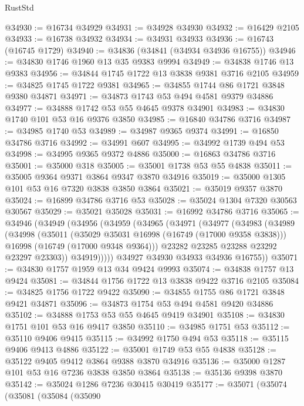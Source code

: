 \begin{lexlean}{RustStd}
\begin{coremodule}
@34930 := @16734 @34929
@34931 := @34928 @34930
@34932 := @16429 @2105
@34933 := @16738 @34932
@34934 := @34931 @34933
@34936 := @16743 (@16745 @1729)
@34940 := @34836 (@34841 (@34934 @34936 @16755))
@34946 := @34830 @1746 @1960 @13 @35 @9383 @9994
@34949 := @34838 @1746 @13 @9383
@34956 := @34844 @1745 @1722 @13 @3838 @9381 @3716 @2105
@34959 := @34825 @1745 @1722 @9381
@34965 := @34855 @1744 @86 @1721 @3848 @9380 @34871
@34971 := @34873 @1743 @53 @494 @4581 @9379 @34886
@34977 := @34888 @1742 @53 @55 @4645 @9378 @34901
@34983 := @34830 @1740 @101 @53 @16 @9376 @3850
@34985 := @16840 @34786 @3716
@34987 := @34985 @1740 @53
@34989 := @34987 @9365 @9374
@34991 := @16850 @34786 @3716
@34992 := @34991 @607
@34995 := @34992 @1739 @494 @53
@34998 := @34995 @9365 @9372 @4886
@35000 := @16863 @34786 @3716
@35001 := @35000 @318
@35005 := @35001 @1738 @53 @55 @4838
@35011 := @35005 @9364 @9371 @3864 @9347 @3870 @34916
@35019 := @35000 @1305 @101 @53 @16 @7320 @3838 @3850 @3864
@35021 := @35019 @9357 @3870
@35024 := @16899 @34786 @3716 @53
@35028 := @35024 @1304 @7320 @30563 @30567
@35029 := @35021 @35028
@35031 := @16992 @34786 @3716
@35065 := @34946
    (@34949
      (@34956
        (@34959
          (@34965
            (@34971
              (@34977
                (@34983
                  (@34989
                    (@34998
                      (@35011
                        (@35029 @35031 @16998 (@16749 (@17000 @9358 @3838)))
                        @16998
                        (@16749 (@17000 @9348 @9364)))
                      @23282
                      @23285
                      @23288
                      @23292
                      @23297
                      @23303))
                  @34919)))))
        @34927
        @34930
        @34933
        @34936
        @16755))
@35071 := @34830 @1757 @1959 @13 @34 @9424 @9993
@35074 := @34838 @1757 @13 @9424
@35081 := @34844 @1756 @1722 @13 @3838 @9422 @3716 @2105
@35084 := @34825 @1756 @1722 @9422
@35090 := @34855 @1755 @86 @1721 @3848 @9421 @34871
@35096 := @34873 @1754 @53 @494 @4581 @9420 @34886
@35102 := @34888 @1753 @53 @55 @4645 @9419 @34901
@35108 := @34830 @1751 @101 @53 @16 @9417 @3850
@35110 := @34985 @1751 @53
@35112 := @35110 @9406 @9415
@35115 := @34992 @1750 @494 @53
@35118 := @35115 @9406 @9413 @4886
@35122 := @35001 @1749 @53 @55 @4838
@35128 := @35122 @9405 @9412 @3864 @9388 @3870 @34916
@35136 := @35000 @1287 @101 @53 @16 @7236 @3838 @3850 @3864
@35138 := @35136 @9398 @3870
@35142 := @35024 @1286 @7236 @30415 @30419
@35177 := @35071
    (@35074
      (@35081
        (@35084
          (@35090

\end{coremodule}
\end{lexlean}
